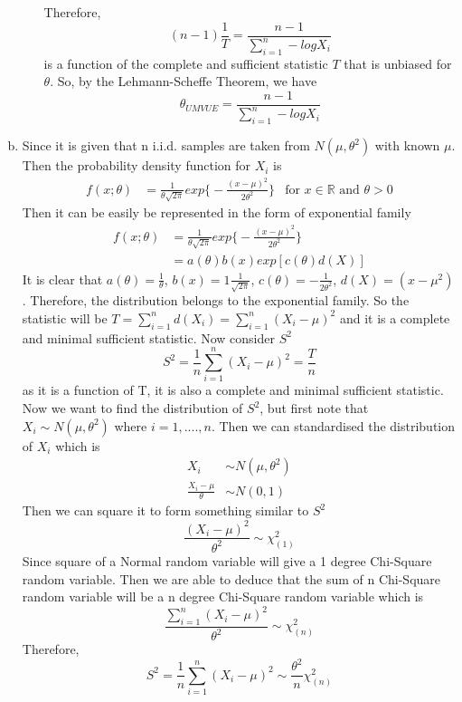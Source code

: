 \documentclass[a4paper,11pt]{article}
\begin{document}
\begin{enumerate}[(a)]
\begin{enumerate}[(i)]
			Therefore, 
			\[
			(n-1)\frac{1}{T} = \frac{n-1}{\sum^n_{i=1} -logX_i}
			\]
			is a function of the complete and sufficient statistic $T$ that is unbiased for $\theta$. So, by the Lehmann-Scheffe Theorem, we have 
			\[
			\hat{\theta}_{UMVUE} = \frac{n-1}{\sum^n_{i=1} -logX_i}
			\]
	\end{enumerate}
	\item
		Since it is given that n i.i.d. samples are taken from $N(\mu,\theta^2)$ with known $\mu$. Then the probability density function for $X_i$ is 
		\begin{align*}
		f(x;\theta) &= \frac{1}{\theta\sqrt{2\pi}}exp\bigg\{-\frac{(x-\mu)^2}{2\theta^2} \bigg\} & \mbox{for }  x \in \mathbb{R} \mbox{ and }\theta>0
		\end{align*}
		Then  it can be easily be represented in the form of exponential family
			\begin{align*}
				f(x;\theta) &=\frac{1}{\theta\sqrt{2\pi}}exp\bigg\{-\frac{(x-\mu)^2}{2\theta^2} \bigg\}  \\
				&= a(\theta)b(x) exp[c(\theta)d(X)]
			\end{align*}
			It is clear that $a(\theta) = \frac{1}{\theta}$, $b(x)=1\frac{1}{\sqrt{2\pi}}$, $c(\theta)=-\frac{1}{2\theta^2}$, $d(X)=(x-\mu^2)$. Therefore, the distribution belongs to the exponential family. So the statistic will be $T = \sum^n_{i=1}d(X_i) =\sum^n_{i=1} (X_i-\mu)^2$ and it is a complete and minimal sufficient statistic.
			\newpage Now consider $S^2$
			\[
			S^2 = \frac{1}{n}\sum^n_{i=1} (X_i-\mu)^2 = \frac{T}{n}
			\]
			as it is a function of T, it is also a complete and minimal sufficient statistic.
			\\Now we want to find the distribution of $S^2$, but first note that $X_i \sim N(\mu,\theta^2)$ where $i = 1,...., n$.
			Then we can standardised the distribution of $X_i$ which is
			\begin{align*}
			X_i& \sim N(\mu,\theta^2)\\
			\frac{X_i-\mu}{\theta} &\sim  N(0,1)
			\end{align*}
			Then we can square it to form something similar to $S^2$
			\[
			\frac{(X_i-\mu)^2}{\theta^2} \sim \chi^2_{(1)}
			\]
			Since square of a Normal random variable will give a 1 degree Chi-Square random variable. Then we are able to deduce that the sum of n Chi-Square random variable will be a n degree Chi-Square random variable which is
			\[
			\frac{\sum^n_{i=1}(X_i-\mu)^2}{\theta^2} \sim \chi^2_{(n)}
			\]
			Therefore,
			\[
			S^2 =  \frac{1}{n}\sum^n_{i=1} (X_i-\mu)^2  \sim  \frac{\theta^2}{n}\chi^2_{(n)}
\]
\end{enumerate}
\end{document}
